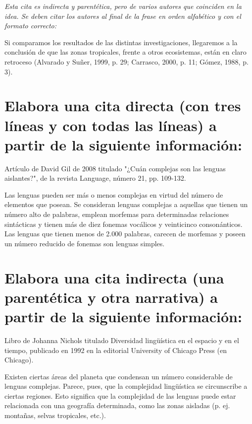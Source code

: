 \documentclass[12pt, a4paper, oneside]{report}
\begin{document}
\begin{Large}
\begin{enumerate}
                \textit{Esta cita es indirecta y parentética, pero de varios autores que coinciden en la idea.
                Se deben citar los autores al final de la frase en orden alfabético y con el formato
                correcto:}

                Si comparamos los resultados de las distintas investigaciones, llegaremos a la conclusión de
                que las zonas tropicales, frente a otros ecosistemas, están en claro retroceso
                (Alvarado y Suñer, 1999, p. 29; Carrasco, 2000, p. 11; Gómez, 1988, p. 3).
            \end{enumerate}
        \end{Large}

        \section{Elabora una cita directa (con tres líneas y con todas las líneas) a partir de la siguiente
        información:}

            Artículo de David Gil de 2008 titulado "¿Cuán complejas son las lenguas aislantes?", de la revista Language, número 21, pp. 109-132.

            Las lenguas pueden ser más o menos complejas en virtud del número de elementos que posean. Se consideran lenguas complejas a aquellas que tienen un número alto de palabras, emplean morfemas para determinadas relaciones sintácticas y tienen más de diez fonemas vocálicos y veinticinco consonánticos. Las lenguas que tienen menos de 2.000 palabras, carecen de morfemas y poseen un número reducido de fonemas son lenguas simples.

        \section{Elabora una cita indirecta (una parentética y otra narrativa) a partir de la siguiente información:}

            Libro de Johanna Nichols titulado Diversidad lingüística en el espacio y en el tiempo, publicado en 1992 en la editorial University of Chicago Press (en Chicago).

            Existen ciertas áreas del planeta que condensan un número considerable de lenguas complejas. Parece, pues, que la complejidad lingüística se circunscribe a ciertas regiones. Esto significa que la complejidad de las lenguas puede estar relacionada con una geografía determinada, como las zonas aisladas (p. ej. montañas, selvas tropicales, etc.).
\end{document}
